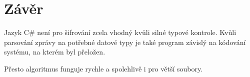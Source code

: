 \setlength{\parskip}{1em}

\chapter*{Závěr}

Jazyk C\# není pro šifrování zcela vhodný kvůli silné typové kontrole. Kvůli parsování zprávy na potřebné datové typy je také program závislý na kódování systému, na kterém byl přeložen.

Přesto algoritmus funguje rychle a spolehlivě i pro větší soubory.